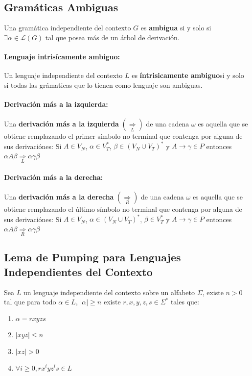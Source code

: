 \subsection{Gramáticas Ambiguas}
Una gramática independiente del contexto \(G\) es \textbf{ambigua} si y solo si \(\exists \alpha\in\mathcal{L}(G)\) tal que posea más de un árbol de derivación.

\paragraph{Lenguaje intrisícamente ambiguo:} Un lenguaje independiente del contexto \(L\) es \textbf{íntrisicamente ambiguo}si y solo si todas las grámaticas que lo tienen como lenguaje son ambiguas.
\paragraph{Derivación más a la izquierda:} Una \textbf{derivación más a la izquierda} \(\left(\underset{L}{\Rightarrow}\right)\) de una cadena \(\omega\) es aquella que se obtiene remplazando el primer símbolo no terminal que contenga por alguna de sus derivaciónes:
Si \(A\in V_N\), \(\alpha\in V_T^*\), \(\beta \in (V_N \cup V_T)^*\) y \(A\to\gamma\in P\) entonces \(\alpha A \beta \underset{L}{\Rightarrow}  \alpha\gamma\beta \)

\paragraph{Derivación más a la derecha:}  Una \textbf{derivación más a la derecha} \(\left(\underset{R}{\Rightarrow}\right)\) de una cadena \(\omega\) es aquella que se obtiene remplazando el último símbolo no terminal que contenga por alguna de sus derivaciónes:
Si \(A\in V_N\), \(\alpha\in (V_N \cup V_T)^*\), \(\beta \in V_T^*\) y \(A\to\gamma\in P\) entonces \(\alpha A \beta \underset{R}{\Rightarrow}  \alpha\gamma\beta \)

\subsection{Lema de Pumping para Lenguajes Independientes del Contexto}
Sea \(L\) un lenguaje independiente del contexto sobre un alfabeto \(\Sigma\), existe \(n > 0\) tal que para todo \(\alpha\in L\), \(|\alpha|\geq n\) existe \(r,x,y,z,s\in\Sigma^*\) tales que:
\begin{enumerate}
  \item \(\alpha = rxyzs\)
  \item \(|xyz|\leq n\)
  \item \(|xz| > 0\)
  \item \(\forall i\geq 0, rx^iyz^is\in L\)
\end{enumerate}
